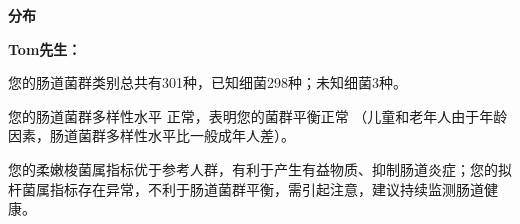 

\usepackage{graphicx}
\graphicspath{{cores/}}



\setlength{\arrayrulewidth}{0.5pt}
\fontsize{9.3pt}{17pt}\selectfont
\color{gray2}

\vspace*{2mm}
\begin{center}
{\bf\sanhao 分布}
\end{center}

\medskip

\noindent
{\bf\xiaosihao Tom先生：}


\bigskip

您的肠道菌群类别总共有301种，已知细菌298种；未知细菌3种。

您的肠道菌群多样性水平
正常，表明您的菌群平衡正常
（儿童和老年人由于年龄因素，肠道菌群多样性水平比一般成年人差）。

您的柔嫩梭菌属指标优于参考人群，有利于产生有益物质、抑制肠道炎症；您的拟杆菌属指标存在异常，不利于肠道菌群平衡，需引起注意，建议持续监测肠道健康。

